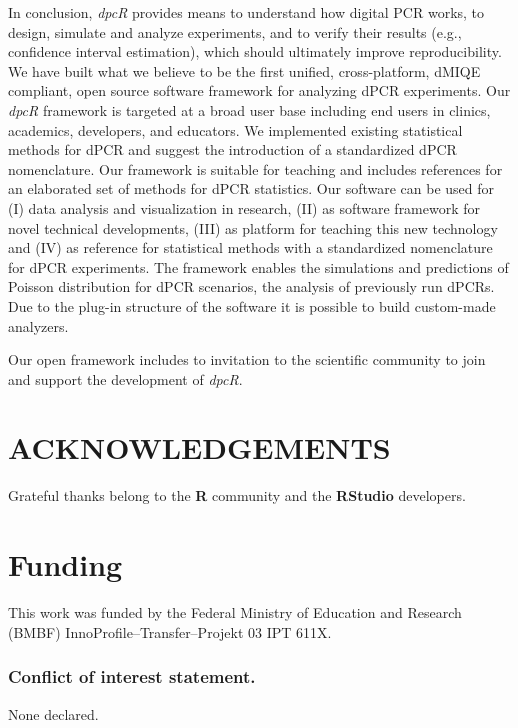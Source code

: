 \documentclass[a4,center,fleqn]{NAR}
\begin{document}
In conclusion, \textit{dpcR} provides means to understand how digital PCR works, 
to design, simulate and analyze experiments, and to verify their results (e.g., 
confidence interval estimation), which should ultimately improve 
reproducibility. We have built what we believe to be the first unified, 
cross-platform, dMIQE compliant, open source software framework for 
analyzing dPCR experiments. Our \textit{dpcR} framework is 
targeted at a broad user base including end users in clinics, academics, 
developers, and educators. We implemented existing statistical methods for dPCR 
and suggest the introduction of a standardized dPCR nomenclature. Our 
framework is suitable for teaching and includes references for an elaborated 
set of methods for dPCR statistics. Our software can be used for (I) data 
analysis and visualization in research, (II) as software framework for novel 
technical developments, (III) as platform for teaching this new technology and 
(IV) as reference for statistical methods with a standardized nomenclature for 
dPCR experiments. The framework enables the simulations and predictions of Poisson 
distribution for dPCR scenarios, the analysis of previously run dPCRs. Due to 
the plug-in structure of the software it is possible to build custom-made 
analyzers.

Our open framework includes to invitation to the scientific community to join and 
support the development of \textit{dpcR}.


\section{ACKNOWLEDGEMENTS}

Grateful thanks belong to the \textbf{R} community and the \textbf{RStudio} developers.

\section{Funding}
This work was funded by the Federal Ministry of Education and Research (BMBF) InnoProfile--Transfer--Projekt 03 IPT 611X.
 
\subsubsection{Conflict of interest statement.} None declared.



\end{document}
